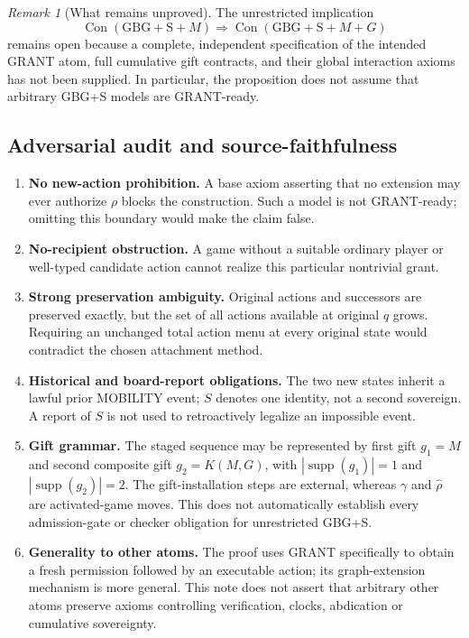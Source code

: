 \documentclass[11pt,letterpaper]{article}
\theoremstyle{definition}\newtheorem{definition}[theorem]{Definition}\newtheorem{example}[theorem]{Example}
\theoremstyle{remark}\newtheorem{remark}[theorem]{Remark}
\newcommand{\Con}{\operatorname{Con}}
\providecommand{\supp}{\operatorname{supp}}
\begin{document}
\begin{remark}[What remains unproved]
The unrestricted implication\[\Con(\mathrm{GBG+S}+M)\Rightarrow\Con(\mathrm{GBG+S}+M+G)\]remains open because a complete, independent specification of the intended GRANT atom, full cumulative gift contracts, and their global interaction axioms has not been supplied. In particular, the proposition does not assume that arbitrary GBG+S models are GRANT-ready.
\end{remark}

\subsection{Adversarial audit and source-faithfulness}
\begin{enumerate}
\item \textbf{No new-action prohibition.} A base axiom asserting that no extension may ever authorize $\rho$ blocks the construction. Such a model is not GRANT-ready; omitting this boundary would make the claim false.
\item \textbf{No-recipient obstruction.} A game without a suitable ordinary player or well-typed candidate action cannot realize this particular nontrivial grant.
\item \textbf{Strong preservation ambiguity.} Original actions and successors are preserved exactly, but the set of all actions available at original $q$ grows. Requiring an unchanged total action menu at every original state would contradict the chosen attachment method.
\item \textbf{Historical and board-report obligations.} The two new states inherit a lawful prior MOBILITY event; $S$ denotes one identity, not a second sovereign. A report of $S$ is not used to retroactively legalize an impossible event.
\item \textbf{Gift grammar.} The staged sequence may be represented by first gift $g_1=M$ and second composite gift $g_2=K(M,G)$, with $|\supp(g_1)|=1$ and $|\supp(g_2)|=2$. The gift-installation steps are external, whereas $\gamma$ and $\widehat\rho$ are activated-game moves. This does not automatically establish every admission-gate or checker obligation for unrestricted GBG+S.
\item \textbf{Generality to other atoms.} The proof uses GRANT specifically to obtain a fresh permission followed by an executable action; its graph-extension mechanism is more general. This note does not assert that arbitrary other atoms preserve axioms controlling verification, clocks, abdication or cumulative sovereignty.
\end{enumerate}
\end{document}
